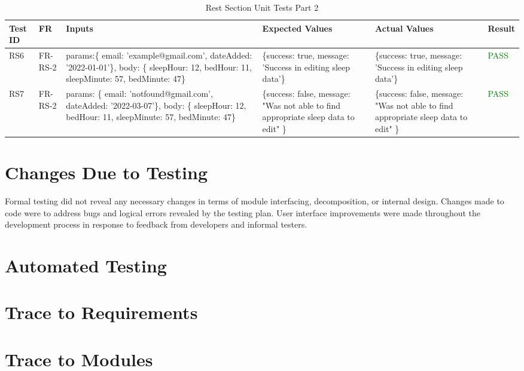 \documentclass[12pt, titlepage]{article}
\begin{document}
\begin{table}[h]
    \centering
    \small
    \begin{tabularx}{\textwidth}{|X|X|p{3cm}|p{2.5cm}|p{2.5cm}|X|}
        \hline
        Test ID & FR & Inputs & Expected Values & Actual Values & Result \\
        \hline
        RS6 & FR-RS-2 & params:\{ email: 'example@gmail.com', dateAdded: '2022-01-01'\},
        body: \{ sleepHour: 12, bedHour: 11, sleepMinute: 57, bedMinute: 47\}  & \{success: true, message: 'Success in editing sleep data'\} & \{success: true, message: 'Success in editing sleep data'\} & \textcolor{Green}{PASS} \\
        \hline
        RS7 & FR-RS-2 & params: \{ email: 'notfound@gmail.com', dateAdded: '2022-03-07'\},
          body: \{ sleepHour: 12, bedHour: 11, sleepMinute: 57, bedMinute: 47\}  & \{success: false, message: "Was not able to find appropriate sleep data to edit" \} & \{success: false, message: "Was not able to find appropriate sleep data to edit" \} & \textcolor{Green}{PASS} \\
        \hline
    \end{tabularx}
    \caption{Rest Section Unit Tests Part 2}
    \label{table:rest-unit-tests2}
\end{table}

\newpage

\section{Changes Due to Testing}
Formal testing did not reveal any necessary changes in terms of module interfacing, decomposition, or internal design. Changes made to code were to address bugs and logical errors revealed by the testing plan. User interface improvements were made throughout the development process in response to feedback from developers and informal testers.

\section{Automated Testing}

\section{Trace to Requirements}

\section{Trace to Modules}		
\end{document}
